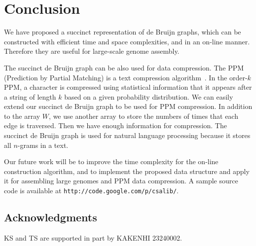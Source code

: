 
\section{Conclusion}\label{p1-sec:conclusion}
We have proposed a succinct representation of de Bruijn graphs,
which can be constructed with efficient time and space complexities,
and in an on-line manner.
Therefore they are useful for large-scale genome assembly.

The succinct de Bruijn graph can be also used for data compression.
The PPM (Prediction by Partial Matching) is a text compression algorithm~\cite{CleWit84}.
In the order-$k$ PPM, a character is compressed using statistical information
that it appears after a string of length $k$ based on a given probability distribution.
We can easily extend our succinct de Bruijn graph to be used for PPM compression.
In addition to the array $W$, we use another array to store the numbers of times
that each edge is traversed.  Then we have enough information for compression.
The succinct de Bruijn graph is used for natural language processing because
it stores all $n$-grams in a text.

Our future work will be to improve the time complexity for the on-line construction
algorithm, and to implement the proposed data structure and apply it
for assembling large genomes and PPM data compression.
A sample source code is available at {\tt http://code.google.com/p/csalib/}.



\subsection*{Acknowledgments}
KS and TS are supported in part by KAKENHI 23240002.





